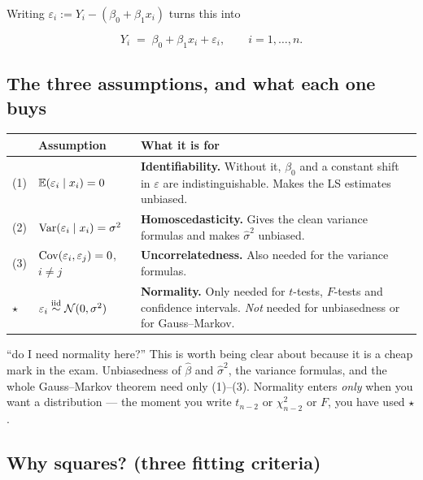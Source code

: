 \documentclass[11pt]{article}
\begin{document}
Writing $\varepsilon_i := Y_i - (\beta_0+\beta_1 x_i)$ turns this into

\begin{equation}\label{eq:slr}
  Y_i \;=\; \beta_0 + \beta_1 x_i + \varepsilon_i, \qquad i=1,\dots,n .
\end{equation}

\subsection{The three assumptions, and what each one buys}

\begin{center}
\begin{tabular}{@{}llp{7.2cm}@{}}
\toprule
 & Assumption & What it is for \\
\midrule
(1) & $\mathbb{E}(\varepsilon_i \mid x_i) = 0$ & \textbf{Identifiability.} Without it, $\beta_0$ and
     a constant shift in $\varepsilon$ are indistinguishable. Makes the LS estimates unbiased. \\
(2) & $\operatorname{Var}(\varepsilon_i \mid x_i) = \sigma^2$ & \textbf{Homoscedasticity.} Gives the clean
     variance formulas and makes $\hat\sigma^2$ unbiased. \\
(3) & $\operatorname{Cov}(\varepsilon_i,\varepsilon_j)=0$, $i\neq j$ & \textbf{Uncorrelatedness.} Also needed for the
     variance formulas. \\
$\star$ & $\varepsilon_i \overset{\text{iid}}{\sim} \mathcal{N}(0,\sigma^2)$ & \textbf{Normality.} Only needed for
     $t$-tests, $F$-tests and confidence intervals. \emph{Not} needed for unbiasedness or
     for Gauss--Markov. \\
\bottomrule
\end{tabular}
\end{center}

\begin{confusion}{``do I need normality here?''}
This is worth being clear about because it is a cheap mark in the exam. Unbiasedness of
$\hat\beta$ and $\hat\sigma^2$, the variance formulas, and the whole Gauss--Markov theorem
need only (1)--(3). Normality enters \emph{only} when you want a distribution --- the
moment you write $t_{n-2}$ or $\chi^2_{n-2}$ or $F$, you have used $\star$.
\end{confusion}

\subsection{Why squares? (three fitting criteria)}
\end{document}
